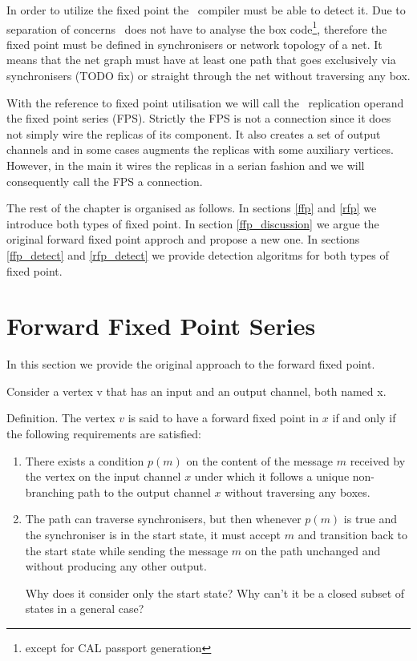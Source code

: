In order to utilize the fixed point the \ak\ compiler must be able to detect it. Due to separation of concerns \ak\ does not have to analyse the box code\footnote{except for CAL passport generation}, therefore the fixed point must be defined in synchronisers or network topology of a net. It means that the net graph must have at least one path that goes exclusively via synchronisers (TODO fix) or straight through the net without traversing any box.


With the reference to fixed point utilisation we will call the \ak\ replication operand the fixed point series (FPS). Strictly the FPS is not a connection since it does not simply wire the replicas of its component. It also creates a set of output channels and in some cases augments the replicas with some auxiliary vertices. However, in the main it wires the replicas in a serian fashion and we will consequently call the FPS a connection.

The rest of the chapter is organised as follows. In sections \ref{ffp} and \ref{rfp} we introduce both types of fixed point. In section \ref{ffp_discussion} we argue the original forward fixed point approch and propose a new one. In sections \ref{ffp_detect} and \ref{rfp_detect} we provide detection algoritms for both types of fixed point.


    \section{Forward Fixed Point Series\label{ffp}}
In this section we provide the original approach to the forward fixed point.

Consider a vertex v that has an input and an output channel, both named x.

Definition. The vertex $v$ is said to have a forward fixed point in $x$ if and only if the following requirements are satisfied:

\begin{enumerate}
\item There exists a condition $p(m)$ on the content of the message $m$ received by the vertex on the input channel $x$ under which it follows a unique non-branching path to the output channel $x$ without traversing any boxes.

\item The path can traverse synchronisers, but then whenever $p(m)$ is true and the synchroniser is in the start state, it must accept $m$ and transition back to the start state while sending the message $m$ on the path unchanged and without producing any other output.

Why does it consider only the start state? Why can't it be a closed subset of states in a general case?
\end{enumerate}


